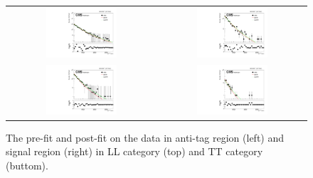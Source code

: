 \begin{itemize}
\begin{figure}[t]
  \centering
 \begin{tabular}{cc}
    \includegraphics[width=0.5\textwidth]{Figures/aa/anti_LL.pdf} &
   \includegraphics[width=0.5\textwidth]{Figures/aa/data_LL.pdf} \\
   \includegraphics[width=0.5\textwidth]{Figures/aa/anti_TT.pdf} &
   \includegraphics[width=0.5\textwidth]{Figures/aa/data_TT.pdf}
  \end{tabular}
  \caption{The pre-fit and post-fit on the data in anti-tag region (left) and signal region (right) in LL category (top) and TT category (buttom).}
  \label{fig:hvt_brs}
\end{figure}

\end{itemize}